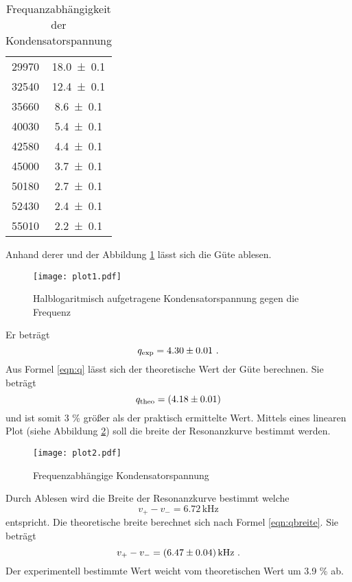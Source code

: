 \begin{table}
\begin{tabular}{c c}
	29970	& \num{18.0 +- 0.1}	\\
	32540	& \num{12.4 +- 0.1}	\\
	35660	& \num{8.6 +- 0.1}	\\
	40030 	& \num{5.4 +- 0.1}	\\
	42580 	& \num{4.4 +- 0.1}	\\
	45000	& \num{3.7 +- 0.1}	\\
	50180	& \num{2.7 +- 0.1}	\\
	52430 	& \num{2.4 +- 0.1}	\\
	55010	& \num{2.2 +- 0.1}	\\
	\bottomrule
 	\end{tabular}
  \caption{Frequanzabhängigkeit der Kondensatorspannung}
  \label{tab:U_c}
\end{table}
Anhand derer und der Abbildung \ref{fig:logUc} lässt sich die Güte ablesen.
\begin{figure}
  \centering
  \texttt{[image: plot1.pdf]}
  \caption{Halblogaritmisch aufgetragene Kondensatorspannung gegen die Frequenz}
  \label{fig:logUc}
\end{figure}
Er beträgt
\begin{equation}
  q_\text{exp} = \num{4.30 +- 0.01} \ .
  \label{eqn:qexp}
\end{equation}
Aus Formel \ref{eqn:q} lässt sich der theoretische Wert der Güte berechnen. Sie beträgt
\begin{equation}
  q_\text{theo} = (\num{4.18 +- 0.01})
  \label{eqn:qtheo}
\end{equation}
und ist somit 3 \% größer als der praktisch ermittelte Wert. Mittels eines linearen Plot (siehe Abbildung \ref{fig:fUc}) soll die breite der Resonanzkurve bestimmt werden.
\begin{figure}
  \centering
  \texttt{[image: plot2.pdf]}
  \caption{Frequenzabhängige Kondensatorspannung}
  \label{fig:fUc}
\end{figure}
Durch Ablesen wird die Breite der Resonanzkurve bestimmt welche
\begin{equation}
  v_+ - v_- = 6.72 \, \text{kHz}
\end{equation}
entspricht. Die theoretische breite berechnet sich nach Formel \ref{eqn:qbreite}. Sie beträgt
\begin{equation}
v_+ - v_- = (\num{6.47 +- 0.04}) \, \text{kHz} \ .
\end{equation}
Der experimentell bestimmte Wert weicht vom theoretischen Wert um 3.9 \% ab.
